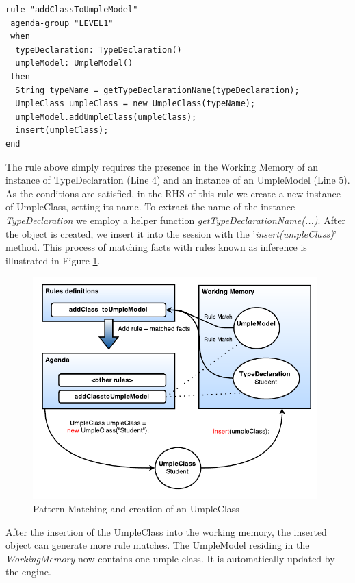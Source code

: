 \begin{lstlisting}[language={drools},label={lst:addClassToUmpleModel}, caption=Rule 'addClassToUmpleModel']
rule "addClassToUmpleModel"
 agenda-group "LEVEL1" 
 when
  typeDeclaration: TypeDeclaration()
  umpleModel: UmpleModel()
 then
  String typeName = getTypeDeclarationName(typeDeclaration);
  UmpleClass umpleClass = new UmpleClass(typeName);
  umpleModel.addUmpleClass(umpleClass);
  insert(umpleClass);
end
\end{lstlisting}

The rule above simply requires the presence in the Working Memory of an instance of TypeDeclaration (Line 4) and an instance of an UmpleModel (Line 5). As the conditions are satisfied, in the RHS of this rule we create a new instance of UmpleClass, setting its name. To extract the name of the instance \textit{TypeDeclaration} we employ a helper function \textit{getTypeDeclarationName(...)}. After the object is created, we insert it into the session with the '\textit{insert(umpleClass)}' method. This process of matching facts with rules known as inference is illustrated in Figure \ref{fig:ruleModel}.

\begin{figure}[h]
\centering
\includegraphics[width=0.98\textwidth]{Figures/ruleModel.pdf}
\caption{Pattern Matching and creation of an UmpleClass}
\label{fig:ruleModel}
\end{figure}

After the insertion of the UmpleClass into the working memory, the inserted object can generate more rule matches. The UmpleModel residing in the \textit{WorkingMemory} now contains one umple class. It is automatically updated by the engine.

